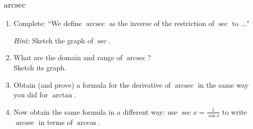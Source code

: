 \documentclass[14pt]{beamer}
\begin{document}
	\begin{frame}[t]
		\frametitle{$\operatorname{arcsec}$}

		\begin{enumerate}
			\item Complete: ``We define $\operatorname{arcsec}$ as the inverse of the
				restriction of $\sec$ to ..."

				\emph{Hint:} Sketch the graph of $\sec$.

				\vfill

			\item What are the domain and range of $\operatorname{arcsec}$? \\ Sketch
				its graph.

				\vfill

			\item Obtain (and prove) a formula for the derivative of $\operatorname{arcsec}$
				in the same way you did for $\arctan$.

				\vfill

			\item Now obtain the same formula in a different way: use
				$\displaystyle \sec x = \frac{1}{\cos x}$ to write
				$\displaystyle \operatorname{arcsec}$ in terms of
				$\displaystyle \arccos$.
		\end{enumerate}
	\end{frame}


\end{document}
